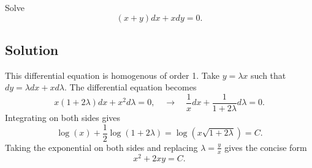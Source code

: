 Solve
\begin{equation*}
    (x + y)dx + xdy = 0.
\end{equation*}

\subsection*{Solution}

This differential equation is homogenous of order 1.
Take $y = \lambda x$ such that $dy = \lambda dx + x d\lambda$.
The differential equation becomes
\begin{equation*}
    x(1 + 2\lambda) dx + x^2 d\lambda = 0, \quad \rightarrow \quad \frac{1}{x} dx + \frac{1}{1 + 2\lambda} d\lambda = 0.
\end{equation*}
Integrating on both sides gives
\begin{equation*}
    \log(x) + \frac{1}{2} \log(1 + 2\lambda) = \log(x \sqrt{1 + 2\lambda}) = C.
\end{equation*}
Taking the exponential on both sides and replacing $\lambda = \frac{y}{x}$ gives the concise form
\begin{equation*}
    x^2 + 2xy = C.
\end{equation*}
